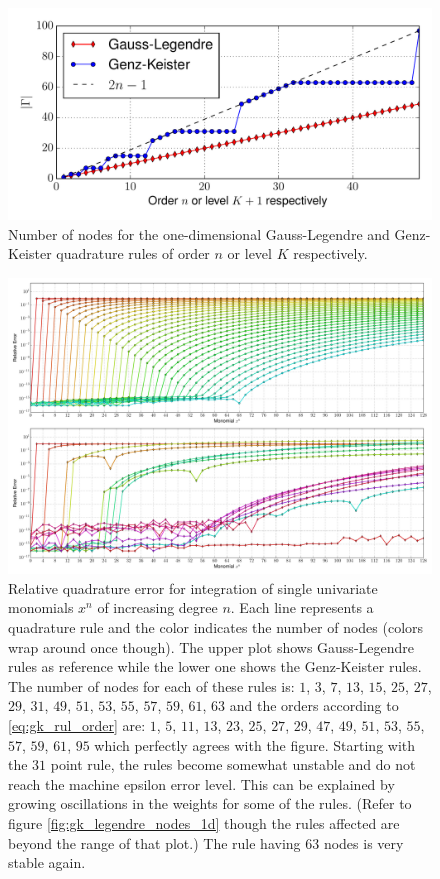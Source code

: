 \documentclass[a4paper,10pt]{article}
\begin{document}
\begin{figure}
  \centering
  \includegraphics[width=\linewidth]{./img/number_nodes_legendre.pdf}
  \caption{Number of nodes for the one-dimensional Gauss-Legendre and Genz-Keister quadrature
  rules of order $n$ or level $K$ respectively.}
  \label{fig:number_nodes_legendre}
\end{figure}

\begin{figure}
  \centering
  \includegraphics[width=\linewidth]{./img/monomial_errors_legendre.pdf}
  \caption{Relative quadrature error for integration of single univariate monomials $x^n$ of increasing degree $n$.
  Each line represents a quadrature rule and the color indicates the number of nodes (colors wrap around once though).
  The upper plot shows Gauss-Legendre rules as reference while the lower one shows the Genz-Keister rules.
  The number of nodes for each of these rules is:
  $1$, $3$,  $7$, $13$, $15$, $25$, $27$, $29$, $31$, $49$, $51$, $53$, $55$, $57$, $59$, $61$, $63$
  and the orders according to \eqref{eq:gk_rul_order} are:
  $1$, $5$, $11$, $13$, $23$, $25$, $27$, $29$, $47$, $49$, $51$, $53$, $55$, $57$, $59$, $61$, $95$
  which perfectly agrees with the figure.
  Starting with the $31$ point rule, the rules become somewhat unstable
  and do not reach the machine epsilon error level. This can be explained
  by growing oscillations in the weights for some of the rules. (Refer to figure
  \ref{fig:gk_legendre_nodes_1d} though the rules affected are beyond the range
  of that plot.) The rule having $63$ nodes is very stable again.}
  \label{fig:monomial_errors_legendre}
\end{figure}
\end{document}
